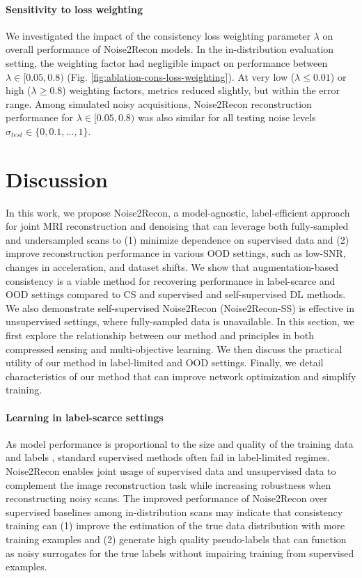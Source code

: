 \documentclass[10pt,twocolumn,letterpaper]{article}
\newcommand{\testnoise}{\sigma_{test}}
\newcommand{\RV}[1]{{#1}}
\begin{document}
\paragraph{Sensitivity to loss weighting} We investigated the impact of the consistency loss weighting parameter $\lambda$ on overall performance of Noise2Recon models. In the in-distribution evaluation setting, the weighting factor had negligible impact on performance between $\lambda \in [0.05, 0.8)$ (Fig. \ref{fig:ablation-cons-loss-weighting}). At very low ($\lambda \leq 0.01$) or high ($\lambda \geq 0.8$) weighting factors, metrics reduced slightly, but within the error range. Among simulated noisy acquisitions, Noise2Recon reconstruction performance for $\lambda \in [0.05, 0.8)$ was also similar for all testing noise levels $\testnoise \in \{0, 0.1, \dots, 1\}$.


\section{Discussion}
In this work, we propose Noise2Recon, \RV{a model-agnostic, label-efficient approach} for joint MRI reconstruction and denoising that can leverage both fully-sampled and undersampled scans to (1) minimize dependence on supervised data and (2) improve reconstruction performance in various OOD settings, such as low-SNR, changes in acceleration, and dataset shifts. We show that augmentation-based consistency is a viable method for recovering performance in label-scarce and OOD settings compared to CS and supervised and self-supervised DL methods. \RV{We also demonstrate self-supervised Noise2Recon (Noise2Recon-SS) is effective in unsupervised settings, where fully-sampled data is unavailable.} In this section, we first explore the relationship between our method and principles in both compressed sensing and \RV{multi-objective} learning. We then discuss the practical utility of our method in label-limited and OOD settings. Finally, we detail characteristics of our method that can improve network optimization and simplify training.

\paragraph{Learning in label-scarce settings} As model performance is proportional to the size and quality of the training data and labels \cite{hestness2017deep,ratner2016data}, standard supervised methods often fail in label-limited regimes. Noise2Recon enables joint usage of supervised data and unsupervised data to complement the image reconstruction task while increasing robustness when reconstructing noisy scans. The improved performance of Noise2Recon over supervised baselines among in-distribution scans may indicate that consistency training can (1) improve the estimation of the true data distribution with more training examples and (2) generate high quality pseudo-labels that can function as noisy surrogates for the true labels without impairing training from supervised examples.
\end{document}
